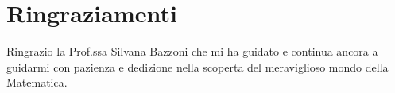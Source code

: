 
\begingroup
\let\clearpage\relax
\let\cleardoublepage\relax
\let\cleardoublepage\relax
\chapter*{Ringraziamenti}
Ringrazio la Prof.ssa Silvana Bazzoni che mi ha guidato e continua ancora a guidarmi con pazienza e dedizione nella scoperta del meraviglioso mondo della Matematica.
\endgroup
